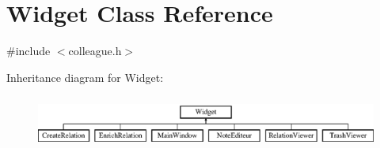 \hypertarget{classWidget}{}\section{Widget Class Reference}
\label{classWidget}


{\ttfamily \#include $<$colleague.\+h$>$}

Inheritance diagram for Widget\+:\begin{figure}[H]
\begin{center}
\leavevmode
\includegraphics[height=1.777778cm]{classWidget}
\end{center}
\end{figure}

